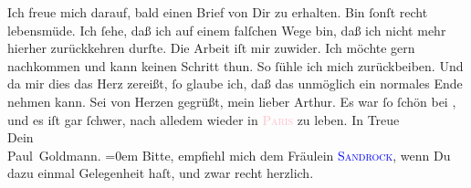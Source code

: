           \pstart
           {\pb}Ich freue mich darauf, bald einen Brief von Dir zu
               erhalten. Bin ſonſt recht lebensmüde. Ich ſehe, daß ich auf einem falſchen Wege bin,
               daß ich nicht mehr hierher zurückkehren durſte. Die Arbeit iſt mir zuwider. Ich
               möchte gern nachkommen und kann keinen Schritt thun. So ſühle ich mich zurückbeiben.
               Und da mir dies das Herz zereißt, ſo glaube ich, daß das unmöglich ein normales Ende
               nehmen kann.\pend
           \pstart
           {\pb}Sei von Herzen gegrüßt, mein lieber Arthur. Es war
               ſo ſchön bei \label{K_L02614-7v}\label{K_L02614-7h}, und es iſt gar ſchwer, nach alledem wieder in \textsc{\textcolor{pink}{Paris}{}\ledrightnote{\textcolor{pink}{Paris}}} zu leben.\pend
           \pstart
           In Treue{\\[\baselineskip]} Dein{\\[\baselineskip]}\spacefill\mbox{Paul Goldmann.}\pend
           \leftskip=0em{}\pstart
           \noindent{}Bitte, empfiehl mich dem Fräulein \textsc{\textcolor{blue}{Sandrock}{}\ledrightnote{\textcolor{blue}{Adele Sandrock}}}, wenn Du dazu einmal Gelegenheit haſt, und \strikeout{\textcolor{gray}{zwarr}} zwar recht herzlich.\pend
           \endnumbering{}\begin{anhang}\end{anhang}
      